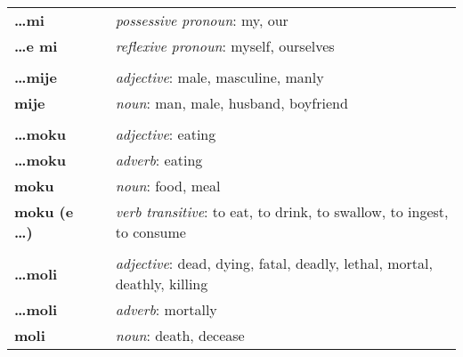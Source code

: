 \begin{supertabular}{p{2,5cm}|ll}
    \textbf{\dots mi}            &  & \textit{possessive pronoun}: my, our                                                                       \\
    \textbf{\dots e mi}          &  & \textit{reflexive pronoun}: myself, ourselves                                                              \\
                                 &  &                                                                                                            \\ %
    \textbf{\dots mije}          &  & \textit{adjective}: male, masculine, manly                                                                 \\
    \textbf{mije}                &  & \textit{noun}: man, male, husband, boyfriend                                                               \\
                                 &  &                                                                                                            \\ %
    \textbf{\dots moku}          &  & \textit{adjective}: eating                                                                                 \\
    \textbf{\dots moku}          &  & \textit{adverb}: eating                                                                                    \\
    \textbf{moku}                &  & \textit{noun}: food, meal                                                                                  \\
    \textbf{moku (e \dots)}      &  & \textit{verb transitive}: to eat, to drink, to swallow, to ingest, to consume                              \\
                                 &  &                                                                                                            \\ %
    \textbf{\dots moli}          &  & \textit{adjective}: dead, dying, fatal, deadly, lethal, mortal, deathly, killing                           \\
    \textbf{\dots moli}          &  & \textit{adverb}: mortally                                                                                  \\
    \textbf{moli}                &  & \textit{noun}: death, decease                                                                              \\

\end{supertabular}
